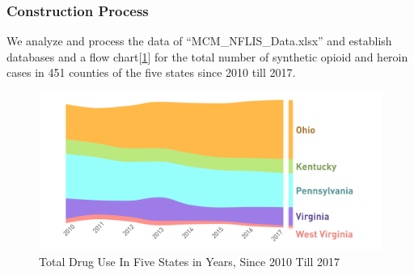\documentclass{mcmthesis}
\begin{document}
\subsubsection{Construction Process}
We analyze and process the data of ``MCM\_NFLIS\_Data.xlsx'' and establish databases and a flow chart[\ref{sum_flowchart}] for the total number of synthetic opioid and heroin cases in 451 counties of the five states since 2010 till 2017.
\begin{figure}[ht]
	\centering
	\includegraphics[width=15cm]{figure-release/StateSum.png}
	\caption{Total Drug Use In Five States in Years, Since 2010 Till 2017}\label{sum_flowchart}
\end{figure}
\end{document}
